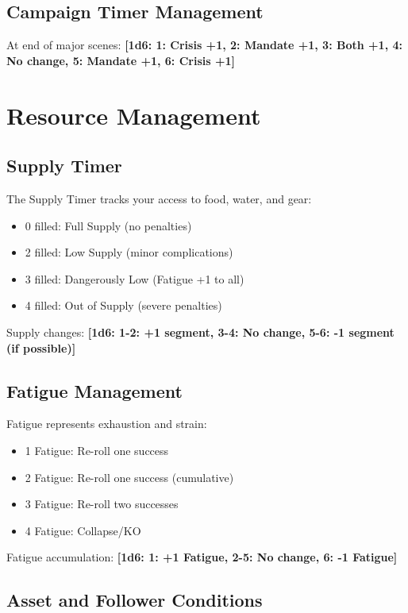 \documentclass[11pt]{article}
\newcommand{\dice}[1]{\textbf{[1d6: #1]}}
\begin{document}
\subsection{Campaign Timer Management}

At end of major scenes:
\dice{1: Crisis +1, 2: Mandate +1, 3: Both +1, 4: No change, 5: Mandate +1, 6: Crisis +1}

\section{Resource Management}

\subsection{Supply Timer }

The Supply Timer tracks your access to food, water, and gear:
\begin{itemize}
    \item 0 filled: Full Supply (no penalties)
    \item 2 filled: Low Supply (minor complications)
    \item 3 filled: Dangerously Low (Fatigue +1 to all)
    \item 4 filled: Out of Supply (severe penalties)
\end{itemize}

Supply changes:
\dice{1-2: +1 segment, 3-4: No change, 5-6: -1 segment (if possible)}

\subsection{Fatigue Management}

Fatigue represents exhaustion and strain:
\begin{itemize}
    \item 1 Fatigue: Re-roll one success
    \item 2 Fatigue: Re-roll one success (cumulative)
    \item 3 Fatigue: Re-roll two successes
    \item 4 Fatigue: Collapse/KO
\end{itemize}

Fatigue accumulation:
\dice{1: +1 Fatigue, 2-5: No change, 6: -1 Fatigue}

\subsection{Asset and Follower Conditions}
\end{document}
